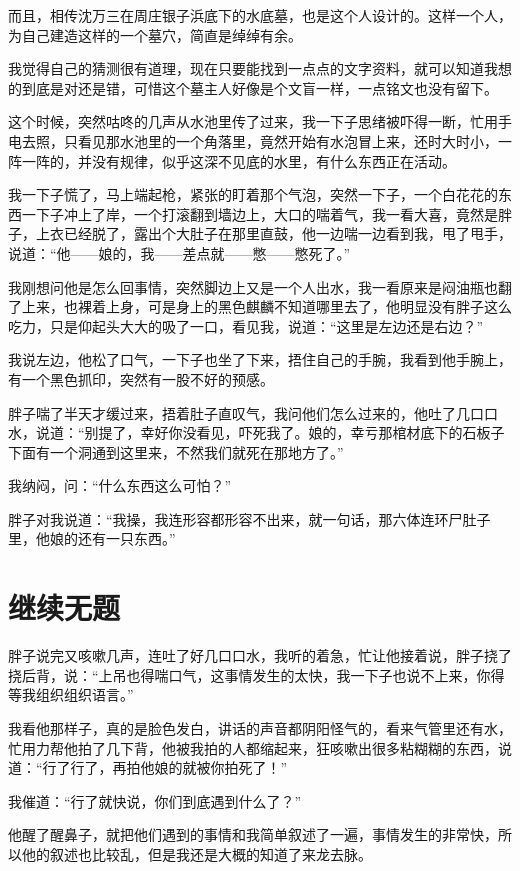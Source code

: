 而且，相传沈万三在周庄银子浜底下的水底墓，也是这个人设计的。这样一个人，为自己建造这样的一个墓穴，简直是绰绰有余。

我觉得自己的猜测很有道理，现在只要能找到一点点的文字资料，就可以知道我想的到底是对还是错，可惜这个墓主人好像是个文盲一样，一点铭文也没有留下。

这个时候，突然咕咚的几声从水池里传了过来，我一下子思绪被吓得一断，忙用手电去照，只看见那水池里的一个角落里，竟然开始有水泡冒上来，还时大时小，一阵一阵的，并没有规律，似乎这深不见底的水里，有什么东西正在活动。

我一下子慌了，马上端起枪，紧张的盯着那个气泡，突然一下子，一个白花花的东西一下子冲上了岸，一个打滚翻到墙边上，大口的喘着气，我一看大喜，竟然是胖子，上衣已经脱了，露出个大肚子在那里直鼓，他一边喘一边看到我，甩了甩手，说道：“他——娘的，我——差点就——憋——憋死了。”

我刚想问他是怎么回事情，突然脚边上又是一个人出水，我一看原来是闷油瓶也翻了上来，也裸着上身，可是身上的黑色麒麟不知道哪里去了，他明显没有胖子这么吃力，只是仰起头大大的吸了一口，看见我，说道：“这里是左边还是右边？”

我说左边，他松了口气，一下子也坐了下来，捂住自己的手腕，我看到他手腕上，有一个黑色抓印，突然有一股不好的预感。

胖子喘了半天才缓过来，捂着肚子直叹气，我问他们怎么过来的，他吐了几口口水，说道：“别提了，幸好你没看见，吓死我了。娘的，幸亏那棺材底下的石板子下面有一个洞通到这里来，不然我们就死在那地方了。”

我纳闷，问：“什么东西这么可怕？”

胖子对我说道：“我操，我连形容都形容不出来，就一句话，那六体连环尸肚子里，他娘的还有一只东西。”

\chapter{继续无题}

胖子说完又咳嗽几声，连吐了好几口口水，我听的着急，忙让他接着说，胖子挠了挠后背，说：“上吊也得喘口气，这事情发生的太快，我一下子也说不上来，你得等我组织组织语言。”

我看他那样子，真的是脸色发白，讲话的声音都阴阳怪气的，看来气管里还有水，忙用力帮他拍了几下背，他被我拍的人都缩起来，狂咳嗽出很多粘糊糊的东西，说道：“行了行了，再拍他娘的就被你拍死了！”

我催道：“行了就快说，你们到底遇到什么了？”

他醒了醒鼻子，就把他们遇到的事情和我简单叙述了一遍，事情发生的非常快，所以他的叙述也比较乱，但是我还是大概的知道了来龙去脉。

